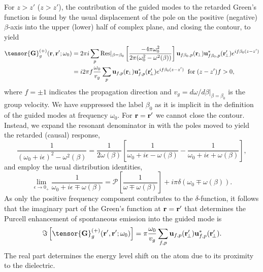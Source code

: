 \documentclass[preprint,aps,pra,onecolumn]{revtex4-1} %
\begin{document}
For $z>z'$ ($z>z'$), the contribution of the guided modes to the retarded Green's function is found by the 
usual displacement of the pole on the positive (negative) $\beta$-axis into the upper (lower) half of 
complex plane, and closing the contour, to yield
\begin{align} 
\tensor{\mathbf{G}}^{(+)}_g(\br,\br'; \omega_0) &= 2\pi i \sum_{p}  {\rm Res}\vert_{\beta =\beta_0} 
\left[\frac{-4\pi \omega_0^2}{2\pi (\omega_0^2-\omega^2(\beta))}\right]  \mathbf{u}_{f\beta_0, p} 
(\br\!_\perp)\mathbf{u}^*_{f\beta_0, p} (\br_{\!\perp}^\prime)e^{if \beta_0 (z-z')} \nonumber \\
&  =  i 2\pi f \frac{\omega_0}{v_g } \sum_{p} \mathbf{u}_{f, p} (\br\!_\perp)\mathbf{u}^*_{f , p} 
(\br_{\!\perp}^\prime) e^{if \beta_0(z-z')}\;\; {\rm for }\;  (z-z')f>0,
\label{eq:Gganaly}
\end{align}
where $f=\pm 1$ indicates the propagation direction and $v_g= d\omega/d\beta \vert_{\beta=\beta_0}$ is the group velocity.   We have suppressed the label $\beta_0$ as it is implicit in the definition of the guided modes at frequency $\omega_0$. For $\mathbf{r}=\mathbf{r}'$ we cannot close the contour. Instead, we expand the resonant denominator in  with the poles moved to yield the retarded (causal) response,
\begin{equation}
\frac{1}{(\omega_0+i\epsilon)^2-\omega^2(\beta)}=\frac{1}{2 \omega(\beta)}\left[ \frac{1}{\omega_0+ i 
\epsilon - \omega(\beta)} - \frac{1}{\omega_0+ i \epsilon + \omega(\beta)} \right],
\end{equation}
 and employ the usual distribution identities,
\begin{equation}
\lim_{\epsilon \rightarrow 0_+} \frac{1}{\omega_0 + i \epsilon \mp 
\omega(\beta)}=\mathcal{P}\left[\frac{1}{\omega \mp \omega(\beta)} \right] + i \pi \delta (\omega_0 \mp 
\omega(\beta)).
\end{equation}
As only the positive frequency component contributes to the $\delta$-function, it follows that the imaginary 
part of the Green's function at $\mathbf{r} = \mathbf{r}'$ that determines the Purcell enhancement of spontaneous 
emission into the guided mode is
\begin{equation}
\Im\left[\tensor{\mathbf{G}}^{(+)}_g(\br',\br'; \omega_0) \right] = \pi \frac{\omega_0}{v_g } \sum_{f, p} 
\mathbf{u}_{f, p} (\br_{\!\perp}^\prime)\mathbf{u}^*_{f , p} (\br_{\!\perp}^\prime).
\end{equation}
The real part determines the energy level shift on the atom due to its proximity to the dielectric.
\end{document}
